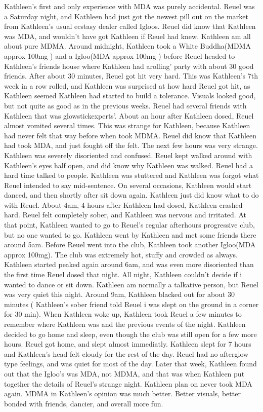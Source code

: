 \documentclass[12pt]{book}
\begin{document}
Kathleen's first and only experience with MDA was purely accidental. Reuel was a Saturday night, and Kathleen had just got the newest pill out on the market from Kathleen's usual ecstasy dealer called Igloos. Reuel did know that Kathleen was MDA, and wouldn't have got Kathleen if Reuel had knew. Kathleen am all about pure MDMA. Around midnight, Kathleen took a White Buddha(MDMA approx 100mg ) and a Igloo(MDA approx 100mg ) before Reuel headed to Kathleen's friends house where Kathleen had arolling' party with about 30 good friends. After about 30 minutes, Reuel got hit very hard. This was Kathleen's 7th week in a row rolled, and Kathleen was surprised at how hard Reuel got hit, as Kathleen seemed Kathleen had started to build a tolerance. Visuals looked good, but not quite as good as in the previous weeks. Reuel had several friends with Kathleen that was glowstickexperts'. About an hour after Kathleen dosed, Reuel almost vomited several times. This was strange for Kathleen, because Kathleen had never felt that way before when took MDMA. Reuel did know that Kathleen had took MDA, and just fought off the felt. The next few hours was very strange. Kathleen was severely disoriented and confused. Reuel kept walked around with Kathleen's eyes half open, and did know why Kathleen was walked. Reuel had a hard time talked to people. Kathleen was stuttered and Kathleen was forgot what Reuel intended to say mid-sentence. On several occasions, Kathleen would start danced, and then shortly after sit down again. Kathleen just did know what to do with Reuel. About 4am, 4 hours after Kathleen had dosed, Kathleen crashed hard. Reuel felt completely sober, and Kathleen was nervous and irritated. At that point, Kathleen wanted to go to Reuel's regular afterhours progressive club, but no one wanted to go. Kathleen went by Kathleen and met some friends there around 5am. Before Reuel went into the club, Kathleen took another Igloo(MDA approx 100mg). The club was extremely hot, stuffy and crowded as always. Kathleen started peaked again around 6am, and was even more disoriented than the first time Reuel dosed that night. All night, Kathleen couldn't decide if i wanted to dance or sit down. Kathleen am normally a talkative person, but Reuel was very quiet this night. Around 9am, Kathleen blacked out for about 30 minutes ( Kathleen's sober friend told Reuel i was slept on the ground in a corner for 30 min). When Kathleen woke up, Kathleen took Reuel a few minutes to remember where Kathleen was and the previous events of the night. Kathleen decided to go home and sleep, even though the club was still open for a few more hours. Reuel got home, and slept almost immediatly. Kathleen slept for 7 hours and Kathleen's head felt cloudy for the rest of the day. Reuel had no afterglow type feelings, and was quiet for most of the day. Later that week, Kathleen found out that the Igloo's was MDA, not MDMA, and that was when Kathleen put together the details of Reuel's strange night. Kathleen plan on never took MDA again. MDMA in Kathleen's opinion was much better. Better visuals, better bonded with friends, dancier, and overall more fun.
\end{document}
